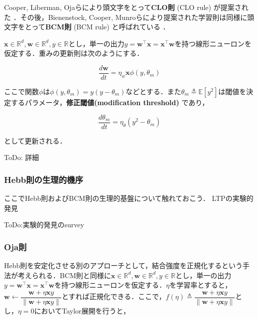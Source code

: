 Cooper, Liberman, Ojaらにより頭文字をとって\textbf{CLO則} (CLO rule) が提案された \citep{Cooper1979-wz}．その後，Bienenstock, Cooper, Munroらにより提案された学習則は同様に頭文字をとって\textbf{BCM則} (BCM rule) と呼ばれている\citep{Bienenstock1982-km} \citep{Cooper2012-ec}．

$\mathbf{x}\in \mathbb{R}^d, \mathbf{w}\in \mathbb{R}^d, y\in \mathbb{R}$とし，単一の出力$y = \mathbf{w}^\top \mathbf{x}=\mathbf{x}^\top \mathbf{w}$を持つ線形ニューロンを仮定する．重みの更新則は次のようにする．


\begin{equation}
\frac{d\mathbf{w}}{dt} = \eta_w \mathbf{x} \phi(y, \theta_m)
\end{equation}


ここで関数$\phi$は$\phi(y, \theta_m)=y(y-\theta_m)$などとする．また$\theta_m\triangleq\mathbb{E}[y^2]$は閾値を決定するパラメータ，\textbf{修正閾値(modification threshold)} であり，


\begin{equation}
\frac{d\theta_m}{dt} = \eta_{\theta} \left(y^2-\theta_m\right)
\end{equation}


として更新される．

ToDo: 詳細




\subsubsection{Hebb則の生理的機序}
ここでHebb則およびBCM則の生理的基盤について触れておこう．
LTPの実験的発見 \citep{Bliss1973-vj} \citep{Dudek1992-nz}

ToDo:実験的発見のsurvey
\subsubsection{Oja則}
Hebb則を安定化させる別のアプローチとして，結合強度を正規化するという手法が考えられる．BCM則と同様に$\mathbf{x}\in \mathbb{R}^d, \mathbf{w}\in \mathbb{R}^d, y\in \mathbb{R}$とし，単一の出力$y = \mathbf{w}^\top \mathbf{x}=\mathbf{x}^\top \mathbf{w}$を持つ線形ニューロンを仮定する．$\eta$を学習率とすると，$\mathbf{w}\leftarrow\dfrac{\mathbf{w}+\eta \mathbf{x}y}{\|\mathbf{w}+\eta \mathbf{x}y\|}$とすれば正規化できる．ここで，$f(\eta)\triangleq\dfrac{\mathbf{w}+\eta \mathbf{x}y}{\|\mathbf{w}+\eta \mathbf{x}y\|}$とし，$\eta=0$においてTaylor展開を行うと，


